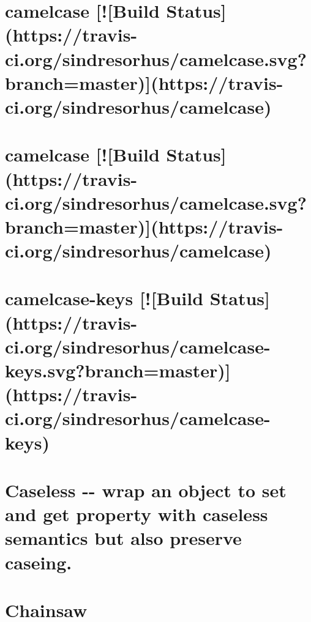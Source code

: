 \documentclass[twoside]{book}
\newcommand{\+}{\discretionary{\mbox{\scriptsize$\hookleftarrow$}}{}{}}
\begin{document}
\chapter{camelcase \mbox{[}!\mbox{[}Build Status\mbox{]}(https\+://travis-\/ci.org/sindresorhus/camelcase.svg?branch=master)\mbox{]}(https\+://travis-\/ci.org/sindresorhus/camelcase)}
\label{md_dsmacc_examples_DRmerge_node_modules_camelcase_readme}

\chapter{camelcase \mbox{[}!\mbox{[}Build Status\mbox{]}(https\+://travis-\/ci.org/sindresorhus/camelcase.svg?branch=master)\mbox{]}(https\+://travis-\/ci.org/sindresorhus/camelcase)}
\label{md_dsmacc_examples_DRmerge_node_modules_camelcase-keys_node_modules_camelcase_readme}

\chapter{camelcase-\/keys \mbox{[}!\mbox{[}Build Status\mbox{]}(https\+://travis-\/ci.org/sindresorhus/camelcase-\/keys.svg?branch=master)\mbox{]}(https\+://travis-\/ci.org/sindresorhus/camelcase-\/keys)}
\label{md_dsmacc_examples_DRmerge_node_modules_camelcase-keys_readme}

\chapter{Caseless -\/-\/ wrap an object to set and get property with caseless semantics but also preserve caseing.}
\label{md_dsmacc_examples_DRmerge_node_modules_caseless_README}

\chapter{Chainsaw}
\label{md_dsmacc_examples_DRmerge_node_modules_chainsaw_README}

\end{document}
